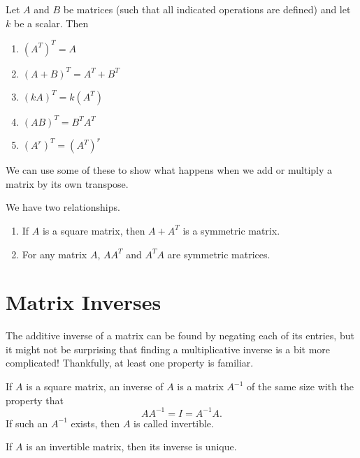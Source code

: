 \documentclass[../m073main.tex]{subfiles}
\begin{document}
\begin{theorem}
	Let $A$ and $B$ be matrices (such that all indicated operations are defined) and let $k$ be a scalar.
	Then
	\begin{multicols}{2}
		\begin{enumerate}[label=(\alph*)]
			\item $(A^T)^T = A$
			\item $(A+B)^T = A^T + B^T$
			\item $(kA)^T = k(A^T)$
			\item $(AB)^T = B^TA^T$
			\item $(A^r)^T = (A^T)^r$
		\end{enumerate}
	\end{multicols}
\end{theorem}

We can use some of these to show what happens when we add or multiply a matrix by its own transpose.

\begin{theorem}
	We have two relationships.
	\begin{enumerate}[label=(\alph*)]
		\item If $A$ is a square matrix, then $A + A^T$ is a symmetric matrix.
		\item For any matrix $A$, $AA^T$ and $A^TA$ are symmetric matrices.
	\end{enumerate}
\end{theorem}

\section{Matrix Inverses}
The additive inverse of a matrix can be found by negating each of its entries, but it might not be surprising that finding a multiplicative inverse is a bit more complicated!
Thankfully, at least one property is familiar.

\begin{definition}
	If $A$ is a square matrix, an inverse of $A$ is a matrix $A^{-1}$ of the same size with the property that
	\[ A A^{-1} = I = A^{-1} A. \]
	If such an $A^{-1}$ exists, then $A$ is called invertible.
\end{definition}

\begin{theorem}
	If $A$ is an invertible matrix, then its inverse is unique.
\end{theorem}
\end{document}
